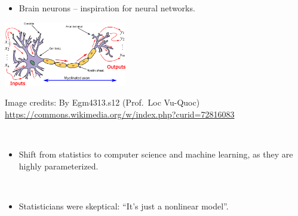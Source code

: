 \documentclass[
  10pt,
  ignorenonframetext,
  twocolumn]{beamer}
\providecommand{\tightlist}{%
  \setlength{\itemsep}{0pt}\setlength{\parskip}{0pt}}
\begin{document}
\begin{frame}
\begin{itemize}
\tightlist
\item
  Brain neurons -- inspiration for neural networks.
\end{itemize}

\centering

\includegraphics[width=0.4\textwidth,height=\textheight]{Neuron3.png}

\scriptsize

Image credits: By Egm4313.s12 (Prof.~Loc Vu-Quoc)
\url{https://commons.wikimedia.org/w/index.php?curid=72816083}

\flushleft

\normalsize

\(~\)

\begin{itemize}
\tightlist
\item
  Shift from statistics to computer science and machine learning, as
  they are highly parameterized.
\end{itemize}

\(~\)

\begin{itemize}
\tightlist
\item
  Statisticians were skeptical: ``It's just a nonlinear model''.
\end{itemize}
\end{frame}
\end{document}
